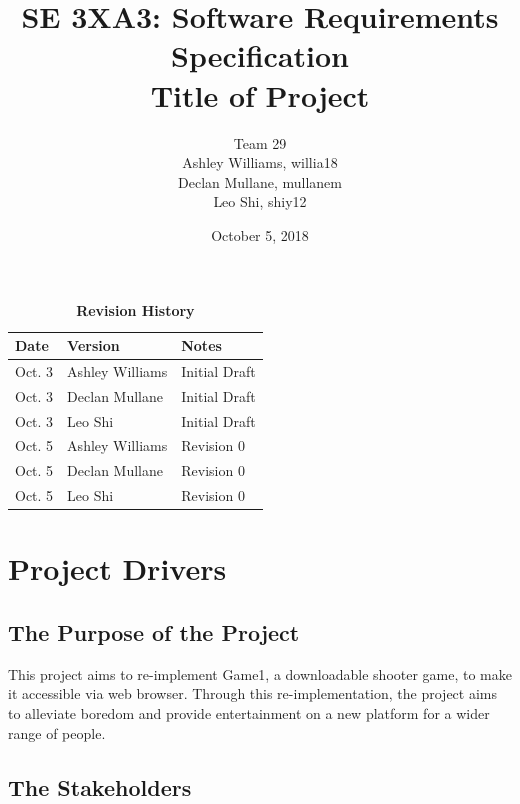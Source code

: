 \documentclass[12pt, titlepage]{article}
\title{SE 3XA3: Software Requirements Specification\\Title of Project}
\author{Team 29
		\\ Ashley Williams, willia18
		\\ Declan Mullane, mullanem
		\\ Leo Shi, shiy12
}
\date{October 5, 2018}
\begin{document}
\maketitle

\tableofcontents
\listoftables
\listoffigures

\begin{table}[bp]
\caption{\bf Revision History}
\begin{tabularx}{\textwidth}{llX}
\toprule {\bf Date} & {\bf Version} & {\bf Notes}\\
\midrule
Oct. 3 & Ashley Williams & Initial Draft\\
Oct. 3 & Declan Mullane & Initial Draft\\
Oct. 3 & Leo Shi & Initial Draft\\
Oct. 5 & Ashley Williams & Revision 0\\
Oct. 5 & Declan Mullane & Revision 0\\
Oct. 5 & Leo Shi & Revision 0\\
\bottomrule
\end{tabularx}
\end{table}

\newpage



\section{Project Drivers}

\subsection{The Purpose of the Project}

This project aims to re-implement Game1, a downloadable shooter game, to make it accessible via web browser. Through this re-implementation, the project aims to alleviate boredom and provide entertainment on a new platform for a wider range of people.  

\subsection{The Stakeholders}
\end{document}
